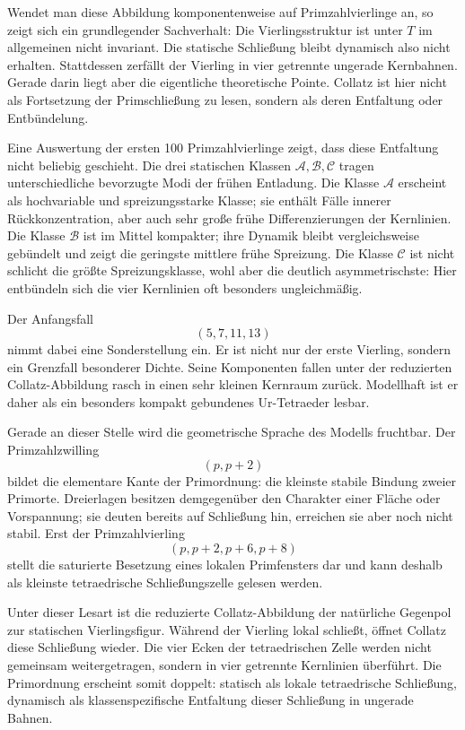 \documentclass[11pt,a4paper]{article}
\theoremstyle{definition}
\begin{document}
Wendet man diese Abbildung komponentenweise auf Primzahlvierlinge an, so
zeigt sich ein grundlegender Sachverhalt: Die Vierlingsstruktur ist unter
$T$ im allgemeinen nicht invariant. Die statische Schlie\ss ung bleibt
dynamisch also nicht erhalten. Stattdessen zerf\"allt der Vierling in vier
getrennte ungerade Kernbahnen. Gerade darin liegt aber die eigentliche
theoretische Pointe. Collatz ist hier nicht als Fortsetzung der
Primschlie\ss ung zu lesen, sondern als deren Entfaltung oder
Entb\"undelung.

Eine Auswertung der ersten 100 Primzahlvierlinge zeigt, dass diese
Entfaltung nicht beliebig geschieht. Die drei statischen Klassen
$\mathcal A,\mathcal B,\mathcal C$ tragen unterschiedliche bevorzugte
Modi der fr\"uhen Entladung. Die Klasse $\mathcal A$ erscheint als
hochvariable und spreizungsstarke Klasse; sie enth\"alt F\"alle innerer
R\"uckkonzentration, aber auch sehr gro\ss e fr\"uhe Differenzierungen der
Kernlinien. Die Klasse $\mathcal B$ ist im Mittel kompakter; ihre Dynamik
bleibt vergleichsweise geb\"undelt und zeigt die geringste mittlere fr\"uhe
Spreizung. Die Klasse $\mathcal C$ ist nicht schlicht die gr\"o\ss te
Spreizungsklasse, wohl aber die deutlich asymmetrischste: Hier
entb\"undeln sich die vier Kernlinien oft besonders ungleichm\"a\ss ig.

Der Anfangsfall
\[
(5,7,11,13)
\]
nimmt dabei eine Sonderstellung ein. Er ist nicht nur der erste Vierling,
sondern ein Grenzfall besonderer Dichte. Seine Komponenten fallen unter
der reduzierten Collatz-Abbildung rasch in einen sehr kleinen Kernraum
zur\"uck. Modellhaft ist er daher als ein besonders kompakt gebundenes
Ur-Tetraeder lesbar.

Gerade an dieser Stelle wird die geometrische Sprache des Modells
fruchtbar. Der Primzahlzwilling
\[
(p,p+2)
\]
bildet die elementare Kante der Primordnung: die kleinste stabile Bindung
zweier Primorte. Dreierlagen besitzen demgegen\"uber den Charakter einer
Fl\"ache oder Vorspannung; sie deuten bereits auf Schlie\ss ung hin,
erreichen sie aber noch nicht stabil. Erst der Primzahlvierling
\[
(p,p+2,p+6,p+8)
\]
stellt die saturierte Besetzung eines lokalen Primfensters dar und kann
deshalb als kleinste tetraedrische Schlie\ss ungszelle gelesen werden.

Unter dieser Lesart ist die reduzierte Collatz-Abbildung der nat\"urliche
Gegenpol zur statischen Vierlingsfigur. W\"ahrend der Vierling lokal
schlie\ss t, \"offnet Collatz diese Schlie\ss ung wieder. Die vier Ecken
der tetraedrischen Zelle werden nicht gemeinsam weitergetragen, sondern
in vier getrennte Kernlinien \"uberf\"uhrt. Die Primordnung erscheint
somit doppelt: statisch als lokale tetraedrische Schlie\ss ung, dynamisch
als klassenspezifische Entfaltung dieser Schlie\ss ung in ungerade
Bahnen.
\end{document}
